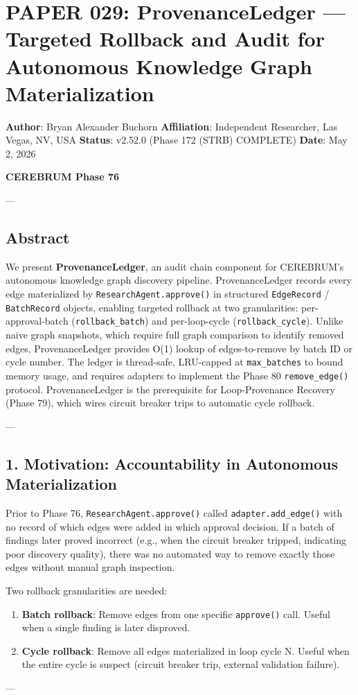 \section{PAPER 029: ProvenanceLedger — Targeted Rollback and Audit for Autonomous Knowledge Graph Materi\-alization}

\textbf{Author}: Bryan Alexander Buchorn  
\textbf{Affiliation}: Independent Researcher, Las Vegas, NV, USA  
\textbf{Status}: v2.52.0 (Phase 172 (STRB) COMPLETE)
\textbf{Date}: May 2, 2026

\textbf{CEREBRUM Phase 76}

---

\subsection{Abstract}

We present \textbf{ProvenanceLedger}, an audit chain component for CEREBRUM's autonomous knowledge graph discovery pipeline. ProvenanceLedger records every edge mater\-ialized by \texttt{ResearchAgent.approve()} in structured \texttt{EdgeRecord} / \texttt{BatchRecord} objects, enabling targeted rollback at two granu\-larities: per-approval-batch (\texttt{rollback\_batch}) and per-loop-cycle (\texttt{rollback\_cycle}). Unlike naive graph snapshots, which require full graph comparison to identify removed edges, ProvenanceLedger provides O(1) lookup of edges-to-remove by batch ID or cycle number. The ledger is thread-safe, LRU-capped at \texttt{max\_batches} to bound memory usage, and requires adapters to implement the Phase 80 \texttt{remove\_edge()} protocol. ProvenanceLedger is the prere\-quisite for Loop-Provenance Recovery (Phase 79), which wires circuit breaker trips to automatic cycle rollback.

---

\subsection{1. Motivation: Accoun\-tability in Autonomous Materi\-alization}

Prior to Phase 76, \texttt{ResearchAgent.approve()} called \texttt{adapter.add\_edge()} with no record of which edges were added in which approval decision. If a batch of findings later proved incorrect (e.g., when the circuit breaker tripped, indicating poor discovery quality), there was no automated way to remove exactly those edges without manual graph inspection.

Two rollback granu\-larities are needed:
\begin{enumerate}
\item \textbf{Batch rollback}: Remove edges from one specific \texttt{approve()} call. Useful when a single finding is later disproved.
\item \textbf{Cycle rollback}: Remove all edges mater\-ialized in loop cycle N. Useful when the entire cycle is suspect (circuit breaker trip, external validation failure).

\end{enumerate}
---

